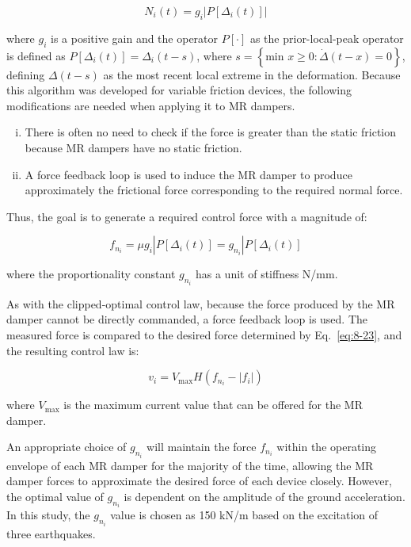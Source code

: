 \begin{equation}\label{eq:8-22}
N_{i}(t)=g_{i}|P\left[\Delta_{i}(t)\right]|
\end{equation}

where $g_{i}$ is a positive gain and the operator $P\left[\cdot\right]$ as the prior-local-peak operator is defined as $P\left[\Delta_{i}(t)\right] = \Delta_{i}(t-s)$, where $s=\left\{\text{min }x\geq 0: \dot{\Delta}\left(t-x\right)=0\right\}$, defining $\Delta\left(t-s\right)$ as the most recent local extreme in the deformation.
Because this algorithm was developed for variable friction devices, the following modifications are needed when applying it to MR dampers.

\begin{enumerate}[(i)]
\item There is often no need to check if the force is greater than the static friction because MR dampers have no static friction.
\item A force feedback loop is used to induce the MR damper to produce approximately the frictional force corresponding to the required normal force.
\end{enumerate}
Thus, the goal is to generate a required control force with a magnitude of:

\begin{equation}\label{eq:8-23}
f_{n_{i}}=\mu g_{i}|P\left[\Delta_{i}(t)\right]=g_{n_{i}}|P\left[\Delta_{i}(t)\right]
\end{equation}

where the proportionality constant $g_{n_{i}}$ has a unit of stiffness N/mm.

As with the clipped-optimal control law, because the force produced by the MR damper cannot be directly commanded, a force feedback loop is used. The measured force is compared to the desired force determined by Eq.~\eqref{eq:8-23}, and the resulting control law is:

\begin{equation}\label{eq:8-24}
v_{i} = V_{\text{max}}H\left(f_{n_{i}}-|f_{i}|\right)
\end{equation}

where $V_{\max}$ is the maximum current value that can be offered for the MR damper.

An appropriate choice of $g_{n_{i}}$ will maintain the force $f_{n_{i}}$ within the operating envelope of each MR damper for the majority of the time, allowing the MR damper forces to approximate the desired force of each device closely. However, the optimal value of $g_{n_{i}}$ is dependent on the amplitude of the ground acceleration. In this study, the $g_{n_{i}}$ value is chosen as 150 kN/m based on the excitation of three earthquakes.

